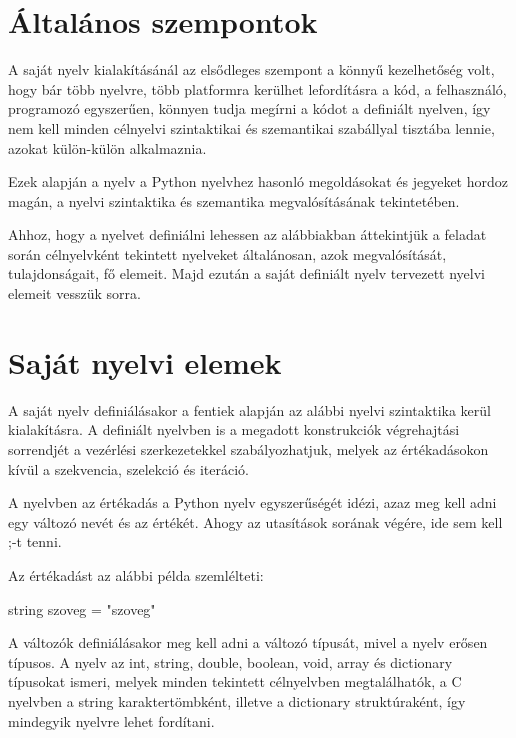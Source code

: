 
\section{Általános szempontok}

A saját nyelv kialakításánál az elsődleges szempont a könnyű kezelhetőség volt, hogy bár több nyelvre, több platformra kerülhet lefordításra a kód, a felhasználó, programozó egyszerűen, könnyen tudja megírni a kódot a definiált nyelven, így nem kell minden célnyelvi szintaktikai és szemantikai szabállyal tisztába lennie, azokat külön-külön alkalmaznia.

Ezek alapján a nyelv a Python nyelvhez hasonló megoldásokat és jegyeket hordoz magán, a nyelvi szintaktika és szemantika megvalósításának tekintetében.

Ahhoz, hogy a nyelvet definiálni lehessen az alábbiakban áttekintjük a feladat során célnyelvként tekintett nyelveket általánosan, azok megvalósítását, tulajdonságait, fő elemeit. Majd ezután a saját definiált nyelv tervezett nyelvi elemeit vesszük sorra.

\section{Saját nyelvi elemek}

A saját nyelv definiálásakor a fentiek alapján az alábbi nyelvi szintaktika kerül kialakításra.
A definiált nyelvben is a megadott konstrukciók végrehajtási sorrendjét a vezérlési szerkezetekkel szabályozhatjuk, melyek az értékadásokon kívül a szekvencia, szelekció és iteráció.

A nyelvben az értékadás a Python nyelv egyszerűségét idézi, azaz meg kell adni egy változó nevét és az értékét. Ahogy az utasítások sorának végére, ide sem kell ;-t tenni.

Az értékadást az alábbi példa szemlélteti:
\begin{cpp}
string szoveg = "szoveg"
\end{cpp}

A változók definiálásakor meg kell adni a változó típusát, mivel a nyelv erősen típusos. A nyelv az int, string, double, boolean, void, array és dictionary típusokat ismeri, melyek minden tekintett célnyelvben megtalálhatók, a C nyelvben a string karaktertömbként, illetve a dictionary struktúraként, így mindegyik nyelvre lehet fordítani.

